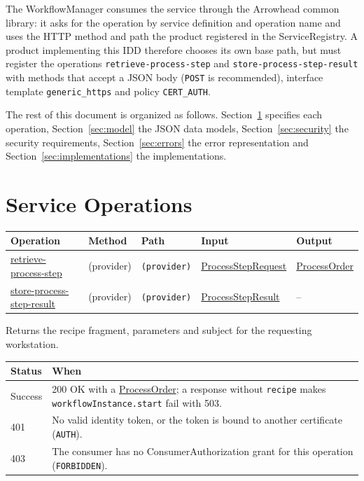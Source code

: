 \documentclass[a4paper]{arrowhead}
\newcommand{\mref}[1]{{\textcolor{ArrowheadPurple}{\hyperref[sec:model:#1]{#1}}}}
\newcommand{\oref}[1]{{\textcolor{ArrowheadBlue}{\hyperref[sec:operations:#1]{#1}}}}
\begin{document}
The WorkflowManager consumes the service through the Arrowhead common library: it asks for the
operation by service definition and operation name and uses the HTTP method and path the product registered in the
ServiceRegistry. A product implementing this IDD therefore chooses its own base path, but must register the operations
\texttt{retrieve-process-step} and \texttt{store-process-step-result} with methods that accept a JSON body
(\texttt{POST} is recommended), interface template \texttt{generic\_https} and policy \texttt{CERT\_AUTH}.

The rest of this document is organized as follows. Section~\ref{sec:operations} specifies each operation,
Section~\ref{sec:model} the JSON data models, Section~\ref{sec:security} the security requirements,
Section~\ref{sec:errors} the error representation and Section~\ref{sec:implementations} the implementations.

\newpage
\section{Service Operations}
\label{sec:operations}

{\small
\begin{longtable}{|p{3.0cm}|p{1.5cm}|p{5.3cm}|p{3.0cm}|p{3.0cm}|}

\hline
\rowcolor{gray!33} Operation & Method & Path & Input & Output \\ \hline
\endhead
\oref{retrieve-process-step} & (provider) & \texttt{(provider)} & \mref{ProcessStepRequest} & \mref{ProcessOrder} \\ \hline
\oref{store-process-step-result} & (provider) & \texttt{(provider)} & \mref{ProcessStepResult} & -- \\ \hline
\end{longtable}
}

Returns the recipe fragment, parameters and subject for the requesting workstation.

{\small
\begin{longtable}{|p{2.0cm}|p{13.8cm}|}

\hline
\rowcolor{gray!33} Status & When \\ \hline
\endhead
Success & 200 OK with a \mref{ProcessOrder}; a response without \texttt{recipe} makes \texttt{workflowInstance.start} fail with 503. \\ \hline
401 & No valid identity token, or the token is bound to another certificate (\texttt{AUTH}). \\ \hline
403 & The consumer has no ConsumerAuthorization grant for this operation (\texttt{FORBIDDEN}). \\ \hline
\end{longtable}
}
\end{document}

